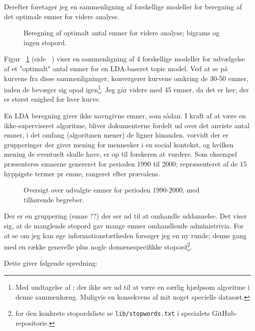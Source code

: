 Derefter foretager jeg en sammenligning af forskellige modeller for beregning af det optimale emner for videre analyse.

\begin{figure}

\caption{Beregning af optimalt antal emner for videre analyse; bigrams og ingen stopord.}
\label{fig:modelsFull}
\end{figure}

Figur ~\ref{fig:modelsFull} (side ~\pageref{fig:modelsFull}) viser en sammenligning af 4 forskellige modeller for udvælgelse af et "optimalt" antal emner for en LDA-baseret topic model.
Ved at se på kurvene fra disse sammenligninger, konvergerer kurvene omkring de 30-50 emner, inden de bevæger sig opad igen\footnote{Med undtagelse af \autocite{deveaudAccurateEffectiveLatent2014}; der ikke ser ud til at være en særlig hjælpsom algoritme i denne sammenhæng. Muligvis en konsekvens af mit noget specielle datasæt.}.
Jeg går videre med 45 emner, da det er her; der er størst enighed for hver kurve.

En LDA beregning giver ikke navngivne emner, som sådan.
I kraft af at være en ikke-superviseret algoritme, bliver dokumenterne fordelt ud over det anviste antal emner, i det omfang (algoritmen mener) de ligner hinanden.
vorvidt der er grupperinger der giver mening for mennesker i en social kontekst, og hvilken mening de eventuelt skulle have, er op til forskeren at vurdere.
Som eksempel præsenteres emnerne genereret for perioden 1990 til 2000; repræsenteret af de 15 hyppigste termer pr emne, rangeret efter prævalens.

\begin{figure}
\begin{adjustwidth}{-1in}{-1in}
  
\end{adjustwidth}
\caption{Oversigt over udvalgte emner for perioden 1990-2000, med tilhørende begreber.}
\label{fig:termsFull}
\end{figure}


Der er en gruppering (emne ??) der ser ud til at omhandle uddannelse.
Det viser sig, at de manglende stopord gav mange emner omhandlende administrivia. For at se om jeg kan øge informationstætheden forsøger jeg en ny runde; denne gang med en række generelle plus nogle domænespecifikke stopord\footnote{for den konkrete stopordsliste se \texttt{lib/stopwords.txt} i specialets GitHub-repositorie.}.

Dette giver følgende spredning:

